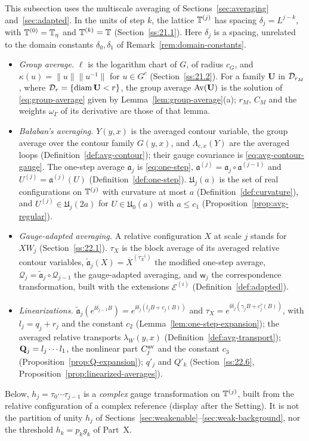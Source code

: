 \begin{readingbox}
This subsection uses the multiscale averaging of Sections~\ref{sec:averaging} and~\ref{sec:adapted}. In the units of step $k$, the lattice $\mathbb T^{(j)}$ has spacing $\delta_j=L^{j-k}$, with $\mathbb T^{(0)}=\mathbb T_\eta$ and $\mathbb T^{(k)}=\mathbb T$ (Section~\ref{ss:21.1}). Here $\delta_j$ is a spacing, unrelated to the domain constants $\delta_0,\delta_1$ of Remark~\ref{rem:domain-constants}.
\begin{itemize}
\item \emph{Group average.} $\ell$ is the logarithm chart of $G$, of radius $c_G$, and $\kappa(u)=\|u\|\|u^{-1}\|$ for $u\in G^c$ (Section~\ref{ss:21.2}). For a family $\mathbf U$ in $\mathcal D_{r_M}$, where $\mathcal D_r=\{\operatorname{diam}\mathbf U<r\}$, the group average $\operatorname{Av}(\mathbf U)$ is the solution of \eqref{eq:group-average} given by Lemma~\ref{lem:group-average}(a); $r_M$, $C_M$ and the weights $\omega_\Gamma$ of its derivative are those of that lemma.
\item \emph{Ba\l aban's averaging.} $Y(y,x)$ is the averaged contour variable, the group average over the contour family $G(y,x)$, and $\Lambda_{c,x}(Y)$ are the averaged loops (Definition~\ref{def:avg-contour}); their gauge covariance is \eqref{eq:avg-contour-gauge}. The one-step average $\mathfrak a_j$ is \eqref{eq:one-step}, $\mathfrak a^{(j)}=\mathfrak a_j\circ\mathfrak a^{(j-1)}$ and $U^{(j)}=\mathfrak a^{(j)}(U)$ (Definition~\ref{def:one-step}). $\mathfrak U_j(a)$ is the set of real configurations on $\mathbb T^{(j)}$ with curvature at most $a$ (Definition~\ref{def:curvature}), and $U^{(j)}\in\mathfrak U_j(2a)$ for $U\in\mathfrak U_0(a)$ with $a\le c_1$ (Proposition~\ref{prop:avg-regular}).
\item \emph{Gauge-adapted averaging.} A relative configuration $X$ at scale $j$ stands for $XW_j$ (Section~\ref{ss:22.1}). $\tau_X$ is the block average of its averaged relative contour variables, $\tilde{\mathfrak a}_j(X)=\overline X^{(\tau_X^{-1})}$ the modified one-step average, $\mathcal Q_j=\tilde{\mathfrak a}_j\circ\mathcal Q_{j-1}$ the gauge-adapted averaging, and $\mathsf w_j$ the correspondence transformation, built with the extensions $\mathcal E^{(i)}$ (Definition~\ref{def:adapted}).
\item \emph{Linearizations.} $\tilde{\mathfrak a}_j(e^{\ii\delta_{j-1}B})=e^{\ii\delta_j(l_jB+c_j(B))}$ and $\tau_X=e^{\ii\delta_j(\gamma_jB+c^\tau_j(B))}$, with $l_j=q_j+r_j$ and the constant $c_2$ (Lemma~\ref{lem:one-step-expansion}); the averaged relative transports $\lambda_W(y,x)$ (Definition~\ref{def:avg-transport}); $\mathbf Q_j=l_j\cdots l_1$, the nonlinear part $C^{\rm av}_j$ and the constant $c_3$ (Proposition~\ref{prop:Q-expansion}); $q'_j$ and $Q'_k$ (Section~\ref{ss:22.6}, Proposition~\ref{prop:linearized-averages}).
\end{itemize}
Below, $h_j=\tau_0\cdots\tau_{j-1}$ is a \emph{complex} gauge transformation on $\mathbb T^{(j)}$, built from the relative configuration of a complex reference (display after the Setting). It is not the partition of unity $h_j$ of Sections~\ref{sec:weakenable}--\ref{sec:weak-background}, nor the threshold $h_k=p_kg_k$ of Part~X.
\end{readingbox}

